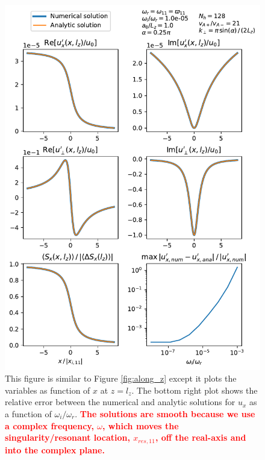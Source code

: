 \documentclass[linenumbers]{aastex63}
\newcommand{\alexedit}[1]{\textcolor{red}{\textbf{#1}}}
\begin{document}
\begin{figure}
    \centering
    \includegraphics[width=17cm,height=0.91\textheight,keepaspectratio]{along_x.pdf}
    \caption{This figure is similar to Figure \ref{fig:along_z} except it plots the variables as function of $x$ at $z=l_z$. The bottom right plot shows the relative error between the numerical and analytic solutions for $u_x$ as a function of $\omega_i / \omega_r$. \alexedit{The solutions are smooth because we use a complex frequency, $\omega$, which moves the singularity/resonant location, $x_{res,11}$, off the real-axis and into the complex plane.}}
    \label{fig:along_x}
\end{figure}
\end{document}
